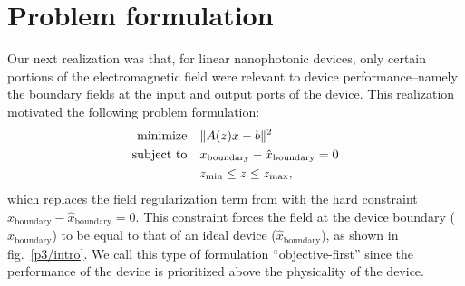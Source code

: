 \section{Problem formulation}
Our next realization was that,
    for linear nanophotonic devices,
    only certain portions of the electromagnetic field were relevant 
    to device performance--namely the boundary fields
    at the input and output ports of the device.
This realization motivated the following problem formulation:
    \begin{subequations}
    \begin{align} 
    \operatorname*{\text{minimize}\quad} & \|A(z)x - b\|^2 \\
    \text{subject to}\quad & x_\text{boundary} - \hat{x}_\text{boundary} = 0 \\
        & z_\text{min} \le z \le z_\text{max},
    \end{align} \label{ob1 problem}
    \end{subequations}
    which replaces the field regularization term from 
    with the hard constraint $x_\text{boundary} - \hat{x}_\text{boundary} = 0$.
This constraint forces the field at the device boundary ($x_\text{boundary}$)
    to be equal to that of an ideal device ($\hat{x}_\text{boundary}$),
    as shown in fig.~\ref{p3/intro}.
We call this type of formulation ``objective-first''
    since the performance of the device is prioritized above
    the physicality of the device.

